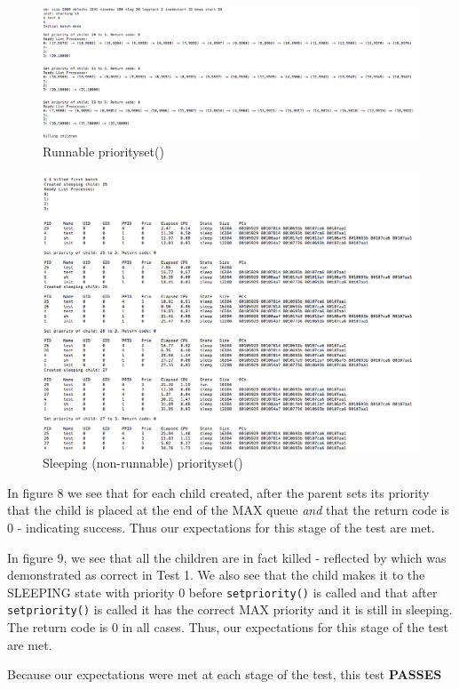 \documentclass[11pt,letterpaper]{report}
\begin{document}
\begin{figure}[h]
\centering
\includegraphics[width=0.8\linewidth]{prio-runnable.png}
\caption{Runnable priorityset()}
\label{fig:5}
\end{figure}

\pagebreak

\begin{figure}[h]
\centering
\includegraphics[width=0.8\linewidth]{prio-nonrunnable.png}
\caption{Sleeping (non-runnable) priorityset()}
\label{fig:5}
\end{figure}



In figure 8 we see that for each child created, after the parent sets its priority that the child is placed at the end of the MAX queue \emph{and} that
the return code is 0 - indicating success. Thus our expectations for this stage of the test are met.

In figure 9, we see that all the children are in fact killed - reflected by  which was demonstrated as correct in Test 1. We also see that the child
makes it to the SLEEPING state with priority 0 before {\tt setpriority()} is called and that after {\tt setpriority()} is called it has the correct MAX priority
and it is still in sleeping. The return code is 0 in all cases. Thus, our expectations for this stage of the test are met.

Because our expectations were met at each stage of the test, this test \textbf{PASSES}
\end{document}
